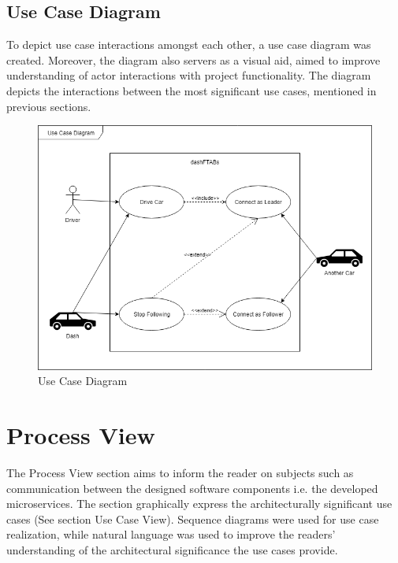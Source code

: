 \documentclass[12pt]{article}
\begin{document}
\subsection{Use Case Diagram}
To depict use case interactions amongst each other, a use case diagram was created. Moreover, the diagram also servers as a visual aid, aimed to improve understanding of actor interactions with project functionality. The diagram depicts the interactions between the most significant use cases, mentioned in previous sections.\par

\begin{figure}[ht!]
\centering
\includegraphics[width=\linewidth]{Diagrams/UseCaseDiagram.png}
\caption{Use Case Diagram}
\label{fig:usecasediagram}
\end{figure}
\pagebreak

\section{Process View}
The Process View section aims to inform the reader on subjects such as communication between the designed software components i.e. the developed microservices. The section graphically express the architecturally significant use cases (See section Use Case View). Sequence diagrams were used for use case realization, while natural language was used to improve the readers’ understanding of the architectural significance the use cases provide.\par
\end{document}
